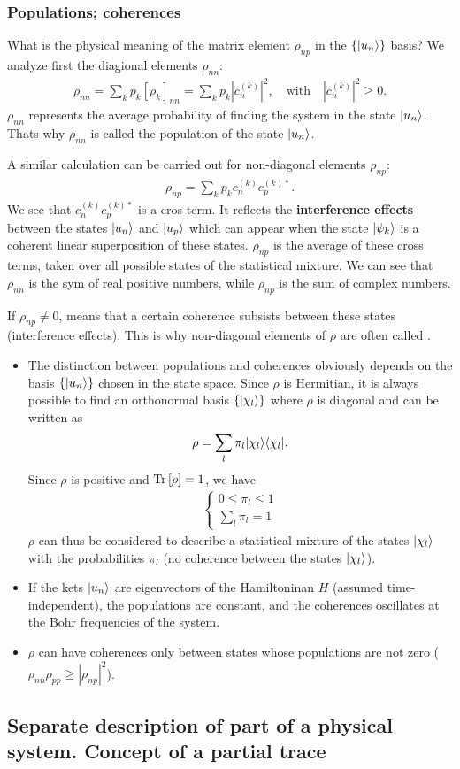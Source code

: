 \subsubsection{Populations; coherences}
What is the physical meaning of the matrix element $\rho_{np}$ in the $\{|u_n\rangle\}$ basis?
We analyze first the diagional elements $\rho_{nn}$:
\begin{align*}
    \rho_{nn}=\sum_kp_k[\rho_k]_{nn}=\sum_kp_k|c_n^{(k)}|^2,\quad\text{with}\quad |c_n^{(k)}|^2\geq0.
\end{align*}
$\rho_{nn}$ represents the average probability of finding the system in the state $|u_n\rangle$. Thats why $\rho_{nn}$ is called the population of the state $|u_n\rangle$.

A similar calculation can be carried out for non-diagonal elements $\rho_{np}$:
\begin{align*}
    \rho_{np}=\sum_kp_kc_n^{(k)}c_p^{(k)*}.
\end{align*}
We see that $c_n^{(k)}c_p^{(k)*}$ is a cros term. It reflects the \textbf{interference effects} between the states $|u_n\rangle$ and $|u_p\rangle$ which can appear when the 
state $|\psi_k\rangle$ is a coherent linear superposition of these states. $\rho_{np}$ is the average of these cross terms, taken over all possible states of the statistical mixture.
We can see that $\rho_{nn}$ is the sym of real positive numbers, while $\rho_{np}$ is the sum of complex numbers.

If $\rho_{np}\neq0$, means that a certain coherence subsists between these states (interference effects). This is why non-diagonal elements of $\rho$ are often called .
\begin{itemize}[itemsep=0pt,topsep=0pt]
    \item The distinction between populations and coherences obviously depends on the basis $\{|u_n\rangle\}$ chosen in the state space. Since $\rho$ is Hermitian, it is always 
    possible to find an orthonormal basis $\{|\chi_l\rangle\}$ where $\rho$ is diagonal and can be written as 
    \begin{align*}
        \rho=\sum_l\pi_l|\chi_l\rangle\langle\chi_l|.
    \end{align*}
    Since $\rho$ is positive and $\text{Tr}\left[\rho\right]=1$, we have 
    \begin{align*}
        \left\{\begin{array}{l}
            0\leq\pi_l\leq1\\
            \sum_l\pi_l=1
        \end{array}\right.
    \end{align*}
    $\rho$ can thus be considered to describe a statistical mixture of the states $|\chi_l\rangle$ with the probabilities $\pi_l$ (no coherence between the states $|\chi_l\rangle$).
    \item If the kets $|u_n\rangle$ are eigenvectors of the Hamiltoninan $H$ (assumed time-independent), the populations are constant, and the coherences oscillates at the Bohr frequencies of the system.
    \item $\rho$ can have coherences only between states whose populations are not zero ($\rho_{nn}\rho_{pp}\geq|\rho_{np}|^2$).
\end{itemize}



\subsection{Separate description of part of a physical system. Concept of a partial trace}
